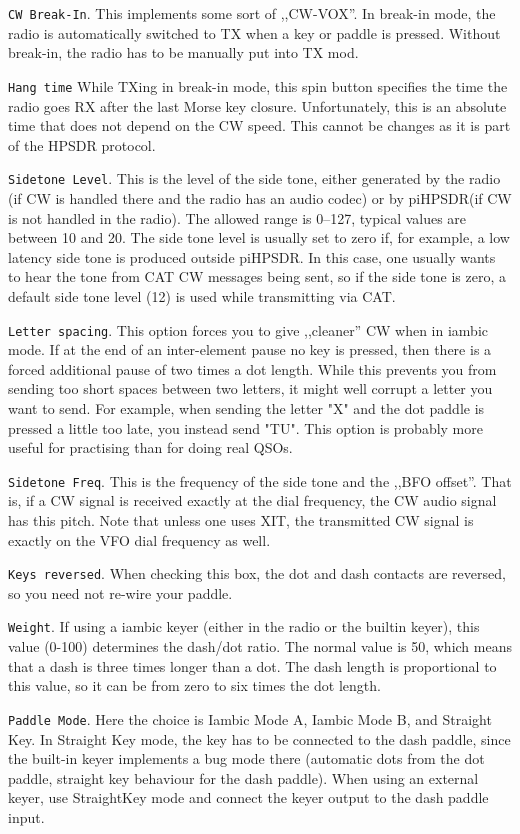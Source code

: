 \documentclass[12pt]{book}
\def\rett#1{\texttt{\color{red}#1}}
\def\pH{pi\-HPSDR\xspace}
\begin{document}
\rett{CW Break-In}. This implements some sort of ,,CW-VOX''. In
break-in mode, the radio is automatically switched to TX when
a key or paddle is pressed. Without break-in, the radio has
to be manually put into TX mod.

\rett{Hang time} While TXing in break-in mode, this spin button
specifies the time the radio goes RX after the last Morse key closure.
Unfortunately, this is an absolute time that does not depend on the
CW speed. This cannot be changes as it is part of the HPSDR protocol.

\rett{Sidetone Level}. This is the level of the side tone,
either generated by the radio (if CW is handled there and the radio
has an audio codec) or
by \pH (if CW is not handled in the radio). The allowed range
is 0--127, typical values are between 10 and 20. The side tone level
is usually set to zero if, for example, a low latency side tone is
produced outside \pH. In this case, one usually wants to hear
the tone from CAT CW messages being sent, so if the side tone is
zero, a default side tone level (12) is used while transmitting
via CAT.

\rett{Letter spacing}. This option forces you to give ,,cleaner'' CW
when in iambic mode. If at the end of an inter-element pause no key is
pressed, then there is a forced additional pause of two times a dot length. While this
prevents you from sending too short spaces between two letters, it
might well corrupt a letter you want to send. For example, when sending
the letter "X" and the dot paddle is pressed a little too late, you
instead send "TU". This option is probably more useful for practising than
for doing real QSOs.

\rett{Sidetone Freq}. This is the frequency of the side tone and the
,,BFO offset''. That is, if a CW signal is received exactly at the
dial frequency, the CW audio signal has this pitch. Note that unless
one uses XIT, the transmitted CW signal is exactly on the VFO dial
frequency as well.

\rett{Keys reversed}. When checking this box, the dot and dash contacts
are reversed, so you need not re-wire your paddle.

\rett{Weight}. If using a iambic keyer (either in the radio or
the builtin keyer), this value (0-100) determines the dash/dot ratio.
The normal value is 50, which means that a dash is three times longer
than a dot. The dash length is proportional to this value, so it can
be from zero to six times the dot length.

\rett{Paddle Mode}. Here the choice is Iambic Mode A, Iambic Mode B,
and  Straight Key. In Straight Key mode, the key has to be connected
to the dash paddle, since the built-in keyer implements a bug mode
there (automatic dots from the dot paddle, straight key behaviour
for the dash paddle). When using an external keyer, use StraightKey
mode and connect the keyer output to the dash paddle input.
\end{document}
